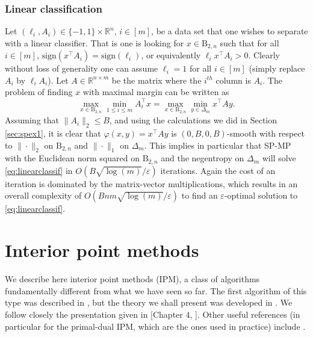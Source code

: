 \documentclass[openany]{now}
\newcommand{\mB}{\mathrm{B}}
\renewcommand{\phi}{\varphi}
\newcommand{\R}{\mathbb{R}}
\renewcommand{\epsilon}{\varepsilon}
\begin{document}
\subsubsection{Linear classification} \label{sec:spex3}
Let $(\ell_i, A_i) \in \{-1,1\} \times \R^n$, $i \in [m]$, be a data set that one wishes to separate with a linear classifier. That is one is looking for $x \in \mB_{2,n}$ such that for all $i \in [m]$, $\mathrm{sign}(x^{\top} A_i) = \mathrm{sign}(\ell_i)$, or equivalently $\ell_i x^{\top} A_i > 0$. Clearly without loss of generality one can assume $\ell_i = 1$ for all $i \in [m]$ (simply replace $A_i$ by $\ell_i A_i$). Let $A \in \R^{n \times m}$ be the matrix where the $i^{th}$ column is $A_i$. The problem of finding $x$ with maximal margin can be written as
\begin{equation} \label{eq:linearclassif}
\max_{x \in \mB_{2,n}} \min_{1 \leq i \leq m} A_i^{\top} x = \max_{x \in \mB_{2,n}} \min_{y \in \Delta_m} x^{\top} A y .
\end{equation}
Assuming that $\|A_i\|_2 \leq B$, and using the calculations we did in Section \ref{sec:spex1}, it is clear that $\phi(x,y) = x^{\top} A y$ is $(0, B, 0, B)$-smooth with respect to $\|\cdot\|_2$ on $\mB_{2,n}$ and $\|\cdot\|_1$ on $\Delta_m$. This implies in particular that SP-MP with the Euclidean norm squared on $\mB_{2,n}$ and the negentropy on $\Delta_m$ will solve \eqref{eq:linearclassif} in $O(B \sqrt{\log(m)} / \epsilon)$ iterations. Again the cost of an iteration is dominated by the matrix-vector multiplications, which results in an overall complexity of $O(B n m \sqrt{\log(m)} / \epsilon)$ to find an $\epsilon$-optimal solution to \eqref{eq:linearclassif}.

\section{Interior point methods} \label{sec:IPM}
We describe here interior point methods (IPM), a class of algorithms fundamentally different from what we have seen so far. The first algorithm of this type was described in \cite{Kar84}, but the theory we shall present was developed in \cite{NN94}. We follow closely the presentation given in [Chapter 4, \cite{Nes04}]. Other useful references (in particular for the primal-dual IPM, which are the ones used in practice) include \cite{Ren01, Nem04b, NW06}.
\newline
\end{document}
